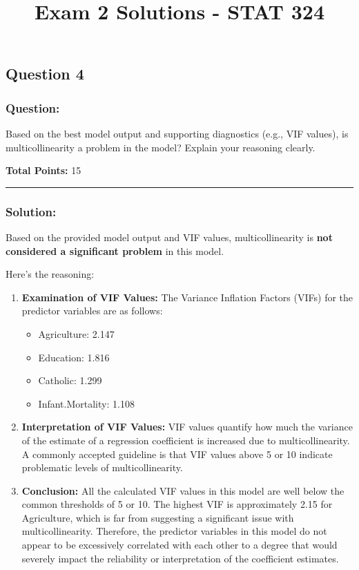 \documentclass[
  letterpaper,
  DIV=11,
  numbers=noendperiod]{scrartcl}
\title{Exam 2 Solutions - STAT 324}
\author{}
\date{}
\providecommand{\tightlist}{%
  \setlength{\itemsep}{0pt}\setlength{\parskip}{0pt}}\usepackage{longtable,booktabs,array}
\begin{document}
\maketitle


\subsection{Question 4}\label{question-4}

\subsubsection{Question:}\label{question}

Based on the best model output and supporting diagnostics (e.g., VIF
values), is multicollinearity a problem in the model? Explain your
reasoning clearly.

\textbf{Total Points:} 15

\begin{center}\rule{0.5\linewidth}{0.5pt}\end{center}

\subsubsection{Solution:}\label{solution}

Based on the provided model output and VIF values, multicollinearity is
\textbf{not considered a significant problem} in this model.

Here's the reasoning:

\begin{enumerate}
\def\labelenumi{\arabic{enumi}.}
\item
  \textbf{Examination of VIF Values:} The Variance Inflation Factors
  (VIFs) for the predictor variables are as follows:

  \begin{itemize}
  \tightlist
  \item
    Agriculture: 2.147
  \item
    Education: 1.816
  \item
    Catholic: 1.299
  \item
    Infant.Mortality: 1.108
  \end{itemize}
\item
  \textbf{Interpretation of VIF Values:} VIF values quantify how much
  the variance of the estimate of a regression coefficient is increased
  due to multicollinearity. A commonly accepted guideline is that VIF
  values above 5 or 10 indicate problematic levels of multicollinearity.
\item
  \textbf{Conclusion:} All the calculated VIF values in this model are
  well below the common thresholds of 5 or 10. The highest VIF is
  approximately 2.15 for Agriculture, which is far from suggesting a
  significant issue with multicollinearity. Therefore, the predictor
  variables in this model do not appear to be excessively correlated
  with each other to a degree that would severely impact the reliability
  or interpretation of the coefficient estimates.
\end{enumerate}
\end{document}
